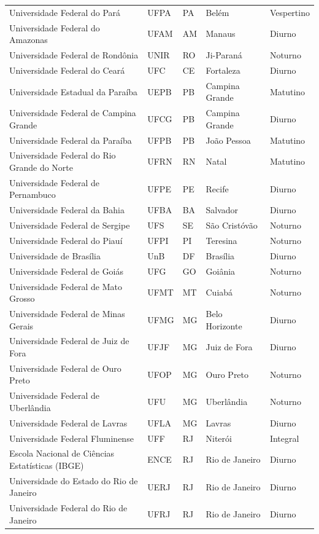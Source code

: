 {\begin{longtable}{p{5.2cm}p{1.2cm}p{0.8cm}p{2.6cm}p{2.6cm}}
Universidade Federal do Par\'a & UFPA & PA & Bel\'em & Vespertino\\
Universidade Federal do Amazonas & UFAM & AM & Manaus & Diurno\\
Universidade Federal de Rond\^onia & UNIR & RO & Ji-Paran\'a & Noturno\\
Universidade Federal do Cear\'a & UFC & CE & Fortaleza & Diurno\\
Universidade Estadual da Para\'iba & UEPB & PB & Campina Grande & Matutino\\
Universidade Federal de Campina Grande & UFCG & PB & Campina Grande & Diurno\\
Universidade Federal da Para\'iba & UFPB & PB & Jo\~ao Pessoa & Matutino\\
Universidade Federal do Rio Grande do Norte & UFRN & RN & Natal & Matutino\\
Universidade Federal de Pernambuco & UFPE & PE & Recife & Diurno\\
Universidade Federal da Bahia & UFBA & BA & Salvador & Diurno\\
Universidade Federal de Sergipe & UFS & SE & S\~ao Crist\'ov\~ao & Noturno\\
Universidade Federal do Piau\'i & UFPI & PI & Teresina & Noturno\\
Universidade de Bras\'ilia & UnB & DF & Bras\'ilia & Diurno\\
Universidade Federal de Goi\'as & UFG & GO & Goi\^ania & Noturno\\
Universidade Federal de Mato Grosso & UFMT & MT & Cuiab\'a & Noturno\\
Universidade Federal de Minas Gerais & UFMG & MG & Belo Horizonte & Diurno\\
Universidade Federal de Juiz de Fora & UFJF & MG & Juiz de Fora & Diurno\\
Universidade Federal de Ouro Preto & UFOP & MG & Ouro Preto & Noturno\\
Universidade Federal de Uberl\^andia & UFU & MG & Uberl\^andia & Noturno\\
Universidade Federal de Lavras & UFLA & MG & Lavras & Diurno\\
Universidade Federal Fluminense & UFF & RJ & Niter\'oi & Integral\\
Escola Nacional de Ci\^encias Estat\'isticas (IBGE) & ENCE & RJ & Rio de Janeiro & Diurno\\
Universidade do Estado do Rio de Janeiro & UERJ & RJ & Rio de Janeiro & Diurno\\
Universidade Federal do Rio de Janeiro & UFRJ & RJ & Rio de Janeiro & Diurno\\

\end{longtable}}
